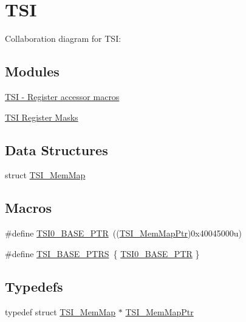 \hypertarget{group___t_s_i___peripheral}{}\section{T\+SI}
\label{group___t_s_i___peripheral}
Collaboration diagram for T\+SI\+:
\subsection*{Modules}
\begin{DoxyCompactItemize}
\item 
\hyperlink{group___t_s_i___register___accessor___macros}{T\+S\+I -\/ Register accessor macros}
\item 
\hyperlink{group___t_s_i___register___masks}{T\+S\+I Register Masks}
\end{DoxyCompactItemize}
\subsection*{Data Structures}
\begin{DoxyCompactItemize}
\item 
struct \hyperlink{struct_t_s_i___mem_map}{T\+S\+I\+\_\+\+Mem\+Map}
\end{DoxyCompactItemize}
\subsection*{Macros}
\begin{DoxyCompactItemize}
\item 
\#define \hyperlink{group___t_s_i___peripheral_gaf98ea1cd15559446e0cfc1ae177751f6}{T\+S\+I0\+\_\+\+B\+A\+S\+E\+\_\+\+P\+TR}~((\hyperlink{group___t_s_i___peripheral_gad1310fedc6b594554cdd760e371de570}{T\+S\+I\+\_\+\+Mem\+Map\+Ptr})0x40045000u)
\item 
\#define \hyperlink{group___t_s_i___peripheral_gaf0e643a8dc882d5a89dd6bb9a4ca3d16}{T\+S\+I\+\_\+\+B\+A\+S\+E\+\_\+\+P\+T\+RS}~\{ \hyperlink{group___t_s_i___peripheral_gaf98ea1cd15559446e0cfc1ae177751f6}{T\+S\+I0\+\_\+\+B\+A\+S\+E\+\_\+\+P\+TR} \}
\end{DoxyCompactItemize}
\subsection*{Typedefs}
\begin{DoxyCompactItemize}
\item 
typedef struct \hyperlink{struct_t_s_i___mem_map}{T\+S\+I\+\_\+\+Mem\+Map} $\ast$ \hyperlink{group___t_s_i___peripheral_gad1310fedc6b594554cdd760e371de570}{T\+S\+I\+\_\+\+Mem\+Map\+Ptr}
\end{DoxyCompactItemize}



